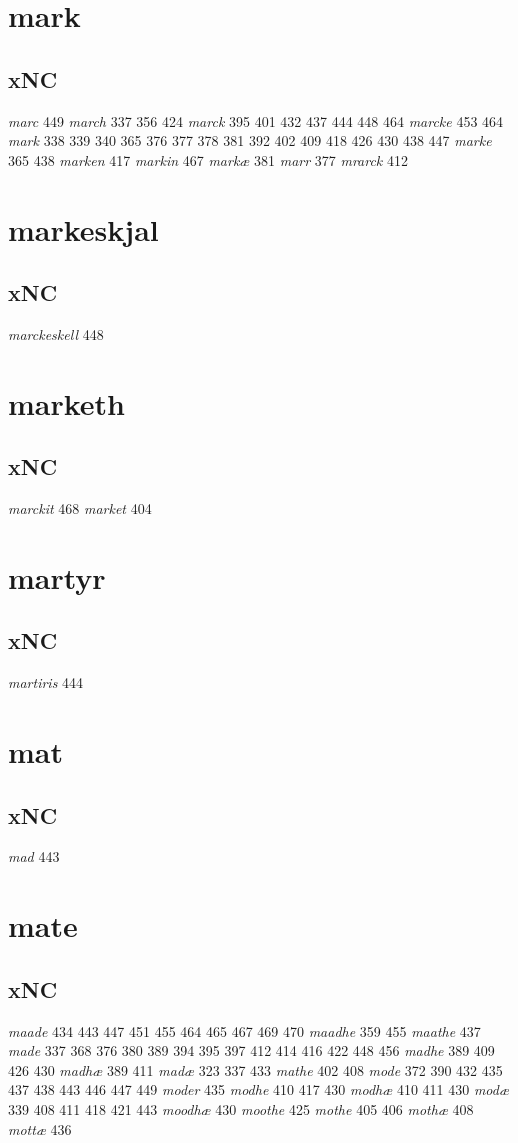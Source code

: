 \documentclass[a4paper,twocolumn]{article}
\begin{document}
\section{mark}
\label{sec:org7693fe1}
\subsection{xNC}
\label{sec:org0512021}
\emph{marc} 449 \emph{march} 337 356 424 \emph{marck} 395 401 432 437 444 448 464 \emph{marcke} 453 464 \emph{mark} 338 339 340 365 376 377 378 381 392 402 409 418 426 430 438 447 \emph{marke} 365 438 \emph{marken} 417 \emph{markin} 467 \emph{markæ} 381 \emph{marr} 377 \emph{mrarck} 412 
\section{markeskjal}
\label{sec:org6f68184}
\subsection{xNC}
\label{sec:org6fd3e1e}
\emph{marckeskell} 448 
\section{marketh}
\label{sec:org878e7fc}
\subsection{xNC}
\label{sec:org67d67e6}
\emph{marckit} 468 \emph{market} 404 
\section{martyr}
\label{sec:org0dff135}
\subsection{xNC}
\label{sec:org79226bf}
\emph{martiris} 444 
\section{mat}
\label{sec:org781e4e7}
\subsection{xNC}
\label{sec:orgb1ee951}
\emph{mad} 443 
\section{mate}
\label{sec:org47ff149}
\subsection{xNC}
\label{sec:orgb5af16f}
\emph{maade} 434 443 447 451 455 464 465 467 469 470 \emph{maadhe} 359 455 \emph{maathe} 437 \emph{made} 337 368 376 380 389 394 395 397 412 414 416 422 448 456 \emph{madhe} 389 409 426 430 \emph{madhæ} 389 411 \emph{madæ} 323 337 433 \emph{mathe} 402 408 \emph{mode} 372 390 432 435 437 438 443 446 447 449 \emph{moder} 435 \emph{modhe} 410 417 430 \emph{modhæ} 410 411 430 \emph{modæ} 339 408 411 418 421 443 \emph{moodhæ} 430 \emph{moothe} 425 \emph{mothe} 405 406 \emph{mothæ} 408 \emph{mottæ} 436 
\end{document}
